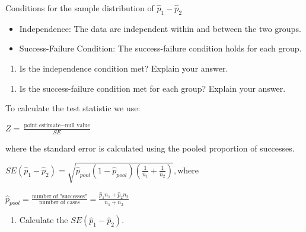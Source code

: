 \documentclass[
]{report}
\providecommand{\tightlist}{%
  \setlength{\itemsep}{0pt}\setlength{\parskip}{0pt}}
\begin{document}
Conditions for the sample distribution of \(\hat{p}_1-\hat{p}_2\)

\begin{itemize}
\item
  Independence: The data are independent within and between the two groups.
\item
  Success-Failure Condition: The success-failure condition holds for each group.
\end{itemize}

\vspace{.25in}

\begin{enumerate}
\def\labelenumi{\arabic{enumi}.}
\setcounter{enumi}{15}
\tightlist
\item
  Is the independence condition met? Explain your answer.
\end{enumerate}

\vspace{1in}

\begin{enumerate}
\def\labelenumi{\arabic{enumi}.}
\setcounter{enumi}{16}
\tightlist
\item
  Is the success-failure condition met for each group? Explain your answer.
\end{enumerate}

\vspace{1in}

To calculate the test statistic we use:

\begin{center}
    $Z = \frac{\text{point estimate} - \text{null value}}{SE}$

where the standard error is calculated using the pooled proportion of successes.

   $SE(\hat{p}_1-\hat{p}_2)=\sqrt{\hat{p}_{pool}(1-\hat{p}_{pool})(\frac{1}{n_1}+\frac{1}{n_2})}, \text{where}$ 
    
   $\hat{p}_{pool} = \frac{\text{number of "successes"}}{\text{number of cases}} = \frac{\hat{p}_1 n_1+\hat{p}_2 n_2}{n_1+n_2}$
    
\end{center}

\vspace{.25in}

\begin{enumerate}
\def\labelenumi{\arabic{enumi}.}
\setcounter{enumi}{17}
\tightlist
\item
  Calculate the \(SE(\hat{p}_1-\hat{p}_2)\).
\end{enumerate}
\end{document}
